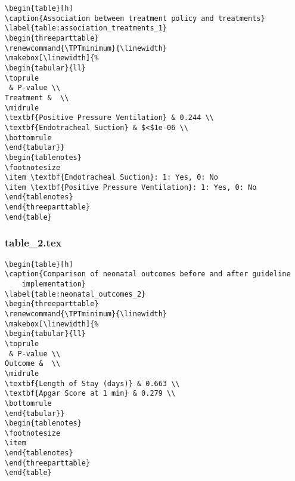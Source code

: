 \documentclass[11pt]{article}
\begin{document}
\begin{Verbatim}[tabsize=4]
\begin{table}[h]
\caption{Association between treatment policy and treatments}
\label{table:association_treatments_1}
\begin{threeparttable}
\renewcommand{\TPTminimum}{\linewidth}
\makebox[\linewidth]{%
\begin{tabular}{ll}
\toprule
 & P-value \\
Treatment &  \\
\midrule
\textbf{Positive Pressure Ventilation} & 0.244 \\
\textbf{Endotracheal Suction} & $<$1e-06 \\
\bottomrule
\end{tabular}}
\begin{tablenotes}
\footnotesize
\item \textbf{Endotracheal Suction}: 1: Yes, 0: No
\item \textbf{Positive Pressure Ventilation}: 1: Yes, 0: No
\end{tablenotes}
\end{threeparttable}
\end{table}

\end{Verbatim}

\subsubsection*{table\_2.tex}

\begin{Verbatim}[tabsize=4]
\begin{table}[h]
\caption{Comparison of neonatal outcomes before and after guideline
	implementation}
\label{table:neonatal_outcomes_2}
\begin{threeparttable}
\renewcommand{\TPTminimum}{\linewidth}
\makebox[\linewidth]{%
\begin{tabular}{ll}
\toprule
 & P-value \\
Outcome &  \\
\midrule
\textbf{Length of Stay (days)} & 0.663 \\
\textbf{Apgar Score at 1 min} & 0.279 \\
\bottomrule
\end{tabular}}
\begin{tablenotes}
\footnotesize
\item
\end{tablenotes}
\end{threeparttable}
\end{table}

\end{Verbatim}




\end{document}
